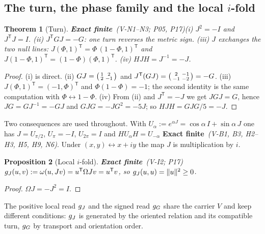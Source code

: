\documentclass[11pt,a4paper]{article}
\newcommand{\tp}{^{\mathsf T}}
\newcommand{\st}[1]{\textsf{\small\textbf{#1}}}
\newcommand{\Sfin}{\st{Exact finite}}\newcommand{\Sder}{\st{Exact derived}}
\theoremstyle{plain}
\newtheorem{thm}{Theorem}[section]
\newtheorem{prop}[thm]{Proposition}
\theoremstyle{definition}
\theoremstyle{remark}
\begin{document}
\subsection{The turn, the phase family and the local $i$-fold}
\begin{thm}[Turn]\Sfin\ \textit{(V-N1--N3; P05, P17)}\label{thm:turn}
(i) $J^2=-I$ and $J\tp J=I$. (ii) $J\tp GJ=-G$: one turn reverses the metric sign. (iii) $J$ exchanges the two null lines: $J(\Phi,1)\tp=\Phi\,(1-\Phi,1)\tp$ and $J(1-\Phi,1)\tp=(1-\Phi)(\Phi,1)\tp$. (iv) $HJH=J^{-1}=-J$.
\end{thm}
\begin{proof}
(i) is direct. (ii) $G J=\begin{psmallmatrix}1&2\\2&-1\end{psmallmatrix}$ and $J\tp(GJ)=\begin{psmallmatrix}2&-1\\-1&-2\end{psmallmatrix}=-G$. (iii) $J(\Phi,1)\tp=(-1,\Phi)\tp$ and $\Phi(1-\Phi)=-1$; the second identity is the same computation with $\Phi\leftrightarrow1-\Phi$. (iv) From (ii) and $J\tp=-J$ we get $JGJ=G$, hence $JG=GJ^{-1}=-GJ$ and $GJG=-JG^2=-5J$; so $HJH=GJG/5=-J$.
\end{proof}
Two consequences are used throughout. With $U_\alpha:=e^{\alpha J}=\cos\alpha\,I+\sin\alpha\,J$ one has $J=U_{\pi/2}$, $U_\pi=-I$, $U_{2\pi}=I$ and $HU_\alpha H=U_{-\alpha}$ \Sfin\ \textit{(V-B1, B3, H2--H3, H5, H9, N6)}. Under $(x,y)\leftrightarrow x+iy$ the map $J$ is multiplication by $i$.

\begin{prop}[Local $i$-fold]\Sfin\ \textit{(V-I2; P17)}\label{prop:ifold}
$\gJ(u,v):=\omega(u,Jv)=u\tp\Omega Jv=u\tp v$, so $g_J(u,u)=\|u\|^2\ge0$.
\end{prop}
\begin{proof}
$\Omega J=-J^2=I$.
\end{proof}
The positive local read $g_J$ and the signed read $g_G$ share the carrier $V$ and keep different conditions: $g_J$ is generated by the oriented relation and its compatible turn, $g_G$ by transport and orientation order.
\end{document}

